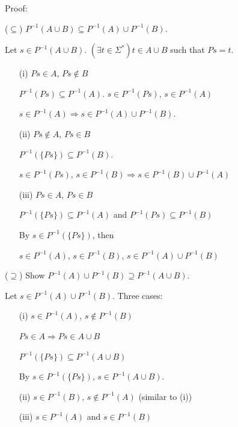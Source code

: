 \documentclass{article}
\begin{document}
\begin{enumerate}
\begin{enumerate}
    Proof:
    
    ($\subseteq$) $P^{-1}(A \cup B) \subseteq P^{-1}(A) \cup P^{-1}(B)$.

    Let $s \in P^{-1}(A \cup B)$. $(\exists t \in \Sigma^*) t \in A \cup B$ such that $Ps = t$.
    
    \begin{itemize}
      \item[(i)] $Ps \in A$, $Ps \notin B$
      
      $P^{-1}(Ps) \subseteq P^{-1}(A)$. $s \in P^{-1}(Ps)$, $s \in P^{-1}(A)$

      $s \in P^{-1}(A) \Rightarrow s \in P^{-1}(A) \cup P^{-1}(B)$.

      \item[(ii)] $Ps \notin A$, $Ps \in B$
      
      $P^{-1}(\{Ps\}) \subseteq P^{-1}(B)$.
      
      $s \in P^{-1}(Ps)$, $s \in P^{-1}(B) \Rightarrow s \in P^{-1}(B) \cup P^{-1}(A)$

      \item[(iii)] $Ps \in A$, $Ps \in B$
      
      $P^{-1}(\{Ps\}) \subseteq P^{-1}(A)$ and $P^{-1}(Ps) \subseteq P^{-1}(B)$

      By $s \in P^{-1}(\{Ps\})$, then

      $s \in P^{-1}(A)$, $s \in P^{-1}(B)$, $s \in P^{-1}(A) \cup P^{-1}(B)$ 

    \end{itemize}

    ($\supseteq$) Show $P^{-1}(A) \cup P^{-1}(B) \supseteq P^{-1}(A \cup B)$.

    Let $s \in P^{-1}(A) \cup P^{-1}(B)$. Three cases:

    \begin{itemize}
      \item[(i)] $s \in P^{-1}(A)$, $s \notin P^{-1}(B)$
      
      $Ps \in A \Rightarrow Ps \in A \cup B$

      $P^{-1}(\{Ps\}) \subseteq P^{-1}(A \cup B)$

      By $s \in P^{-1}(\{Ps\})$, $s \in P^{-1}(A \cup B)$.

      \item[(ii)] $s \in P^{-1}(B)$, $s \notin P^{-1}(A)$ (similar to (i))
      
      \item[(iii)] $s \in P^{-1}(A)$ and $s \in P^{-1}(B)$
      

\end{itemize}
\end{enumerate}
\end{enumerate}
\end{document}

